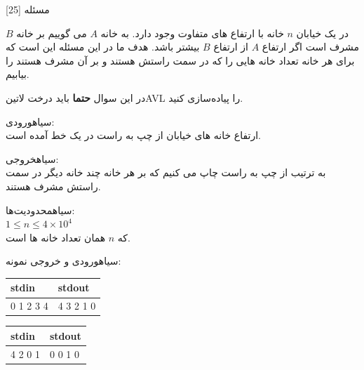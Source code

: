 ‌مسئله [25]

در یک خیابان $n$ خانه با ارتفاع های متفاوت وجود دارد.
به خانه $A$ می گوییم بر خانه $B$ مشرف است اگر ارتفاع $A$ از ارتفاع $B$ بیشتر باشد.
هدف ما در این مسئله این است که برای هر خانه تعداد خانه هایی را که در سمت راستش هستند و بر آن مشرف هستند را بیابیم.

در این سوال \textbf{حتما} باید درخت ‌لاتین{AVL} را پیاده‌سازی کنید.

‌سیاه{ورودی:}\\
ارتفاع خانه های خیابان از چپ به راست در یک خط آمده است.

‌سیاه{خروجی:}\\
به ترتیب از چپ به راست چاپ می کنیم که بر هر خانه چند خانه دیگر در سمت راستش مشرف هستند.

‌سیاه{محدودیت‌ها:}\\
$1\leq n\leq 4 \times 10^4$\\
که $n$ همان تعداد خانه ها است.

‌سیاه{ورودی و خروجی نمونه:}\\


\begin{latin}
	\begin{tabularx}{\textwidth}{|X | X|}
		\hline
		\textbf{stdin} &
		\textbf{stdout}\\
		\hline
		0 1 2 3 4
		
		&
		
		4 3 2 1 0\\
		\hline
		
	\end{tabularx}
\end{latin}


\begin{latin}
	\begin{tabularx}{\textwidth}{|X | X|}
		\hline
		\textbf{stdin} &
		\textbf{stdout}\\
		\hline
		4 2 0 1
		
		&
		
		0 0 1 0\\
		\hline
		
	\end{tabularx}
\end{latin}


